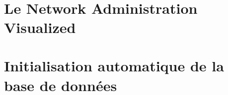 \documentclass[12pt]{report}
\begin{document}
\pageDeGarde

\pagecolor{white}
\thispagestyle{empty}\ \clearpage







\tableofcontents

\listofalgorithms

\listoffigures 

\listoftables


\clearpage
{}
\setcounter{page}{1}


\printglossaries



\lhead[]{} \rhead[]{} \chead[]{}

\fancyhead[L]{\tiny \leftmark}
\fancyhead[R]{\scriptsize \rightmark}
\fancyfoot[C]{\thepage}

 
 \chapter{Le Network Administration Visualized}
   
   
   
 \chapter{Initialisation automatique de la base de données}\label{init_db}
   
   
   

   
  

%

% 





%
\appendix
%


 
\end{document}
